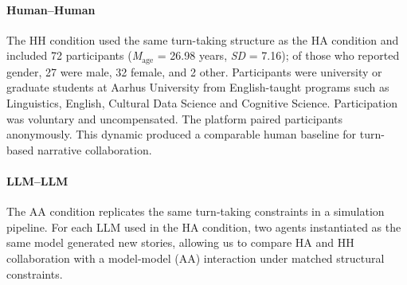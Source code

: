 \documentclass[11pt]{article}
\begin{document}
\paragraph{Human--Human} 
The HH condition used the same turn-taking structure as the HA condition and included 72 participants (\textit{M}$_{\text{age}}$ = 26.98 years, \textit{SD} = 7.16); of those who reported gender, 27 were male, 32 female, and 2 other. 
Participants were university or graduate students at Aarhus University from English-taught programs such as Linguistics, English, Cultural Data Science and Cognitive Science. Participation was voluntary and uncompensated. %
The platform paired participants anonymously. This dynamic produced a comparable human baseline for turn-based narrative collaboration.

\paragraph{LLM--LLM}
The AA condition replicates the same turn-taking constraints in a simulation pipeline. For each LLM used in the HA condition, two agents instantiated as the same model generated new stories, allowing us to compare HA and HH collaboration with a model-model (AA) interaction under matched structural constraints. 
\end{document}

